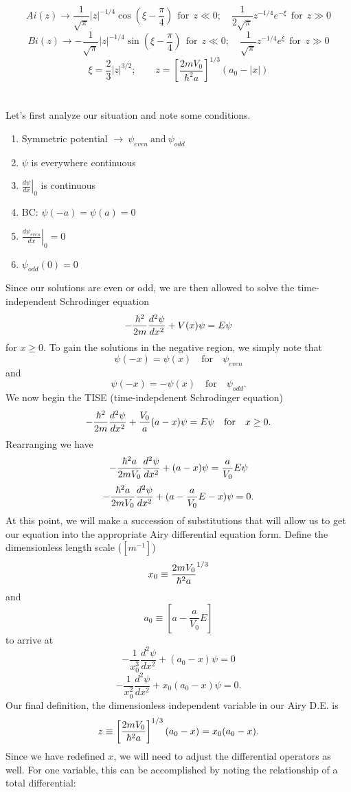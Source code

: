 \documentclass[11pt,letterpaper]{article}
\begin{document}
\begin{enumerate}
\begin{enumerate}
$$Ai(z) \to \frac{1}{\sqrt\pi}|z|^{-1/4}\cos(\xi-\frac{\pi}{4})\ \ \text{for}\ \  z\ll0;\quad\frac{1}{2\sqrt\pi}z^{-1/4}e^{-\xi}\ \ \text{for}\ \  z\gg0 $$
$$Bi(z) \to -\frac{1}{\sqrt\pi}|z|^{-1/4}\sin(\xi-\frac{\pi}{4})\ \ \text{for}\ \  z\ll0;\quad\frac{1}{\sqrt\pi}z^{-1/4}e^{\xi}\ \ \text{for}\ \  z\gg0 $$
$$\xi = \frac{2}{3}|z|^{3/2};\qquad z= \left[\frac{2mV_0}{\hbar^2a}\right]^{1/3}(a_0-|x|)$$
\\ \\ Let's first analyze our situation and note some conditions. 
\begin{enumerate}
\item Symmetric potential $\rightarrow\ \psi_{even}\ \text{and}\ \psi_{odd}$
\item $\psi$ is everywhere continuous
\item $\displaystyle \left.\frac{d\psi}{dx}\right|_0$ is continuous
\item BC: $\psi(-a) = \psi(a) = 0$
\item $\displaystyle \left.\frac{d\psi_{even}}{dx}\right|_0=0$
\item $\psi_{odd}(0) = 0$
\end{enumerate}
Since our solutions are even or odd, we are then allowed to solve the time-independent Schrodinger equation 
$$-\frac{\hbar^2}{2m}\frac{d^2\psi}{dx^2}+V(x)\psi = E\psi$$
for $x\ge0$. To gain the solutions in the negative region, we simply note that 
$$\psi(-x) = \psi(x)\quad\text{for}\quad \psi_{even}$$
and
$$\psi(-x) = -\psi(x)\quad\text{for}\quad \psi_{odd}.$$ We now begin the TISE (time-indepdenent Schrodinger equation)
$$-\frac{\hbar^2}{2m}\frac{d^2\psi}{dx^2}+\frac{V_0}{a}(a-x)\psi = E\psi\quad\text{for}\quad x\ge0.$$
Rearranging we have
$$-\frac{\hbar^2a}{2mV_0}\frac{d^2\psi}{dx^2}+(a-x)\psi = \frac{a}{V_0}E\psi$$
$$-\frac{\hbar^2a}{2mV_0}\frac{d^2\psi}{dx^2}+(a-\frac{a}{V_0}E-x)\psi = 0.$$
At this point, we will make a succession of substitutions that will allow us to get our equation into the appropriate Airy differential equation form. Define the dimensionless length scale ($[m^{-1}]$)
$$x_0 \equiv \frac{2mV_0}{\hbar^2a}^{1/3}$$
and
$$a_0 \equiv \left[a-\frac{a}{V_0}E\right]$$
to arrive at
$$-\frac{1}{x_0^3}\frac{d^2\psi}{dx^2}+(a_0-x)\psi = 0$$
$$-\frac{1}{x_0^2}\frac{d^2\psi}{dx^2}+x_0(a_0-x)\psi = 0.$$
Our final definition, the dimensionless independent variable in our Airy D.E. is 
$$z\equiv \left[\frac{2mV_0}{\hbar^2a}\right]^{1/3}(a_0-x)=x_0(a_0-x).$$
Since we have redefined $x$, we will need to adjust the differential operators as well. For one variable, this can be accomplished by noting the relationship of a total differential:

\end{enumerate}
\end{enumerate}
\end{document}
